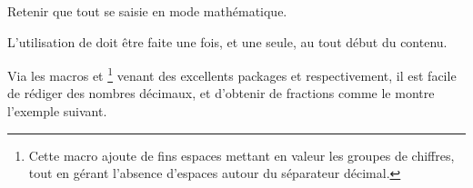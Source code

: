 \documentclass{tutodoc}
\begin{document}


\begin{tdocexa}
    \leavevmode

\end{tdocexa}


\begin{tdocnote}
	Retenir que tout se saisie en mode mathématique.
\end{tdocnote}


\begin{tdocwarn}
	L'utilisation de  doit être faite une fois, et une seule, au tout début du contenu.
\end{tdocwarn}




\begin{tdocexa}
    \leavevmode

\end{tdocexa}




\begin{tdocexa}
    \leavevmode

\end{tdocexa}



\begin{tdoctip}
%
    Via les macros  et 
    \footnote{
    	Cette macro ajoute de fins espaces mettant en valeur les groupes de chiffres, tout en gérant l'absence d'espaces autour du séparateur décimal.
    }
    venant des excellents packages  et  respectivement, il est facile de rédiger des nombres décimaux, et d'obtenir de  fractions comme le montre l'exemple suivant.

\end{tdoctip}
\end{document}
